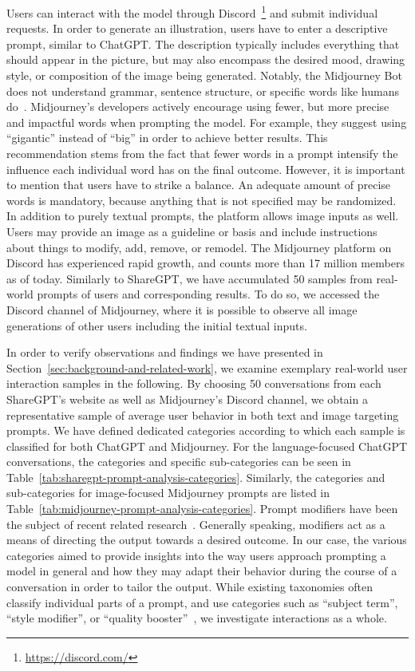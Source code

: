 Users can interact with the model through Discord~\footnote{\url{https://discord.com/}} and submit
individual requests.
In order to generate an illustration, users have to enter a descriptive prompt, similar to
ChatGPT\@.
The description typically includes everything that should appear in the picture, but may also
encompass the desired mood, drawing style, or composition of the image being generated.
Notably, the Midjourney Bot does not understand grammar, sentence structure, or specific words like
humans do~\cite{midjourney_documentation_2023}.
Midjourney's developers actively encourage using fewer, but more precise and impactful words when
prompting the model.
For example, they suggest using ``gigantic'' instead of ``big'' in order to achieve
better results.
This recommendation stems from the fact that fewer words in a prompt intensify the influence each
individual word has on the final outcome.
However, it is important to mention that users have to strike a balance.
An adequate amount of precise words is mandatory, because anything that is not specified may be
randomized.
In addition to purely textual prompts, the platform allows image inputs as well.
Users may provide an image as a guideline or basis and include instructions about things to modify,
add, remove, or remodel.
The Midjourney platform on Discord has experienced rapid growth, and counts more than 17 million
members as of today.
Similarly to ShareGPT, we have accumulated 50 samples from real-world prompts of users and
corresponding results.
To do so, we accessed the Discord channel of Midjourney, where it is possible to observe all image
generations of other users including the initial textual inputs.
\newline

In order to verify observations and findings we have presented in Section~\ref{sec:background-and-related-work},
we examine exemplary real-world user interaction samples in the following.
By choosing 50 conversations from each ShareGPT's website as well as Midjourney's Discord
channel, we obtain a representative sample of average user behavior in both text and image targeting prompts.
We have defined dedicated categories according to which each sample is classified for both
ChatGPT and Midjourney.
For the language-focused ChatGPT conversations, the categories and specific sub-categories can be
seen in Table~\ref{tab:sharegpt-prompt-analysis-categories}.
Similarly, the categories and sub-categories for image-focused Midjourney prompts are listed
in Table~\ref{tab:midjourney-prompt-analysis-categories}.
Prompt modifiers have been the subject of recent related research~\cite{oppenlaender_taxonomy_2023}.
Generally speaking, modifiers act as a means of directing the output towards a desired outcome.
In our case, the various categories aimed to provide insights into the way users approach prompting
a model in general and how they may adapt their behavior during the course of a conversation in
order to tailor the output.
While existing taxonomies often classify individual parts of a prompt, and use
categories such as ``subject term'', ``style modifier'', or ``quality booster''~\cite{oppenlaender_taxonomy_2023}, we
investigate interactions as a whole.

